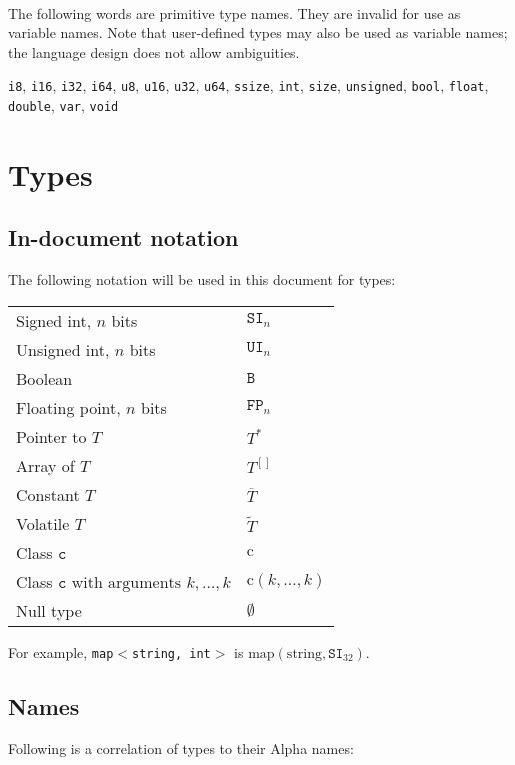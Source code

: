 \documentclass{article}
\newcommand{\R}[1]{\mathtt{#1}}
\newcommand{\K}[1]{\mathrm{#1}}
\begin{document}
\ \\

The following words are primitive type names. They are invalid for use as
variable names. Note that user-defined types may also be used as variable names;
the language design does not allow ambiguities.

\texttt{i8},
\texttt{i16},
\texttt{i32},
\texttt{i64},
\texttt{u8},
\texttt{u16},
\texttt{u32},
\texttt{u64},
\texttt{ssize},
\texttt{int},
\texttt{size},
\texttt{unsigned},
\texttt{bool},
\texttt{float},
\texttt{double},
\texttt{var},
\texttt{void}

\section{Types}
\label{sec:types}

\subsection{In-document notation}
\label{sub:types:indoc}
The following notation will be used in this document for types:

\begin{tabular}{|l|l|}
\hline
Signed int, $n$ bits & $\R{SI}_n$ \\
Unsigned int, $n$ bits & $\R{UI}_n$ \\
Boolean & $\R{B}$ \\
Floating point, $n$ bits & $\R{FP}_n$ \\
Pointer to $T$ & $T^*$ \\
Array of $T$ & $T^{[]}$ \\
Constant $T$ & $\overline{T}$ \\
Volatile $T$ & $\widetilde{T}$ \\
Class $\R{c}$ & $\K{c}$ \\
Class $\R{c} \textrm{ with arguments } k, \ldots, k$ & $\K{c}(k, \ldots, k)$ \\
Null type & $\emptyset$ \\
\hline
\end{tabular}

For example, \texttt{map$<$string, int$>$} is
$\K{map}(\K{string}, \R{SI}_{32})$.

\subsection{Names}
\label{sub:types:names}
Following is a correlation of types to their Alpha names:
\end{document}
